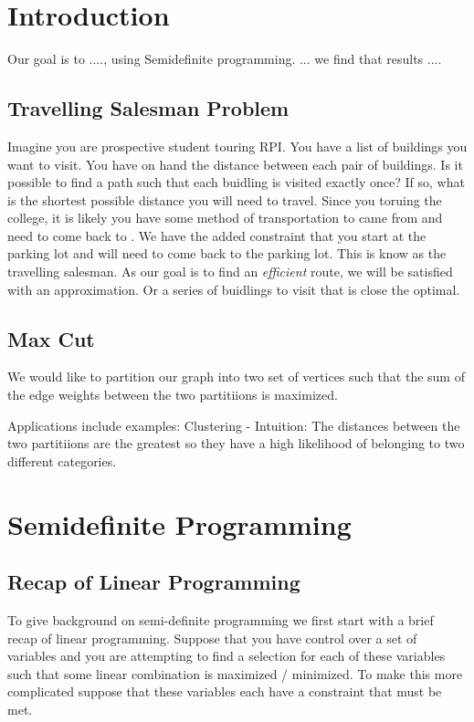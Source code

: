 \documentclass{article}
\begin{document}
\section{Introduction}

Our goal is to ...., using Semidefinite programming. ... we find that results ....

\subsection{Travelling Salesman Problem} %
Imagine you are prospective student touring RPI. You have a list of buildings you want to visit.
You have on hand the distance between each pair of buildings. 
Is it possible to find a path such that each buidling is visited exactly once? 
If so, what is the shortest possible distance you will need to travel. 
Since you toruing the college, it is likely you have some method of transportation to came from and need to come back to . 
We have the added constraint that you start at the parking lot and will need to come back to the parking lot.
This is know as the travelling salesman.
As our goal is to find an \emph{efficient} route, we will be satisfied with an approximation. 
Or a series of buidlings to visit that is close the optimal.

\subsection{Max Cut} %
We would like to partition our graph into two set of vertices such that the sum of the edge weights between the two partitiions is maximized. 

Applications include 
examples: Clustering
- Intuition: The distances between the two partitiions are the greatest so they have a high likelihood of belonging to two different categories. 


\section{Semidefinite Programming}  %

\subsection{Recap of Linear Programming}
To give background on semi-definite programming we first start with a brief recap of linear programming. Suppose that you have control over a set of variables and you are attempting to find a selection for each of these variables such that some linear combination is maximized / minimized. To make this more complicated suppose that these variables each have a constraint that must be met.
\end{document}
